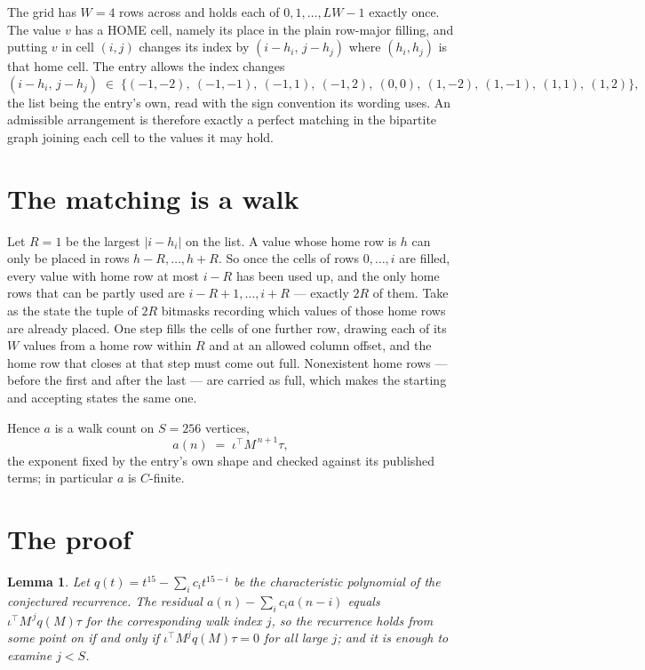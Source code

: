 \documentclass[11pt,a4paper]{article}
\theoremstyle{plain}
\newtheorem{lemma}[theorem]{Lemma}
\theoremstyle{definition}
\begin{document}
The grid has $W=4$ rows across and holds each of $0,1,\dots,LW-1$ exactly once. The value
$v$ has a HOME cell, namely its place in the plain row-major filling, and putting $v$ in cell
$(i,j)$ changes its index by $(i-h_i,\,j-h_j)$ where $(h_i,h_j)$ is that home cell. The entry
allows the index changes
\[
(i-h_i,\,j-h_j)\;\in\;\{(-1,-2),\ (-1,-1),\ (-1,1),\ (-1,2),\ (0,0),\ (1,-2),\ (1,-1),\ (1,1),\ (1,2)\},
\]
the list being the entry's own, read with the sign convention its wording uses. An admissible
arrangement is therefore exactly a perfect matching in the bipartite graph joining each cell to
the values it may hold.

\section{The matching is a walk}

Let $R=1$ be the largest $|i-h_i|$ on the list. A value whose home row is $h$ can only be
placed in rows $h-R,\dots,h+R$. So once the cells of rows $0,\dots,i$ are filled, every
value with home row at most $i-R$ has been used up, and the only home rows that can be
partly used are $i-R+1,\dots,i+R$ --- exactly $2R$ of them. Take as the state the tuple of
$2R$ bitmasks recording which values of those home rows are already placed. One step fills
the cells of one further row, drawing each of its $W$ values from a home row within $R$
and at an allowed column offset, and the home row that closes at that step must come out
full. Nonexistent home rows --- before the first and after the last --- are carried as
full, which makes the starting and accepting states the same one.

Hence $a$ is a walk count on $S=256$ vertices,
\[
a(n)\;=\;\iota^{\!\top}M^{\,n+1}\tau ,
\]
the exponent fixed by the entry's own shape and checked against its published terms; in
particular $a$ is $C$-finite.

\section{The proof}

\begin{lemma}\label{lem:crit}
Let $q(t)=t^{15}-\sum_i c_it^{15-i}$ be the characteristic polynomial of the
conjectured recurrence. The residual $a(n)-\sum_ic_ia(n-i)$ equals
$\iota^{\!\top}M^{\,j}q(M)\tau$ for the corresponding walk index $j$, so the recurrence
holds from some point on if and only if $\iota^{\!\top}M^{j}q(M)\tau=0$ for all large $j$;
and it is enough to examine $j<S$.
\end{lemma}
\end{document}
